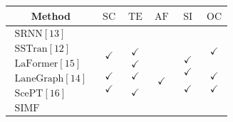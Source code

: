\documentclass{article}
\begin{document}

\begin{table}\vspace{-0.18in}
\begin{center}
 \setlength\tabcolsep{-0.75pt}
 \vspace{-8pt}
\begin{tabular}{cccccc}

\hline Method & $\mathrm{SC}$ & $\mathrm{TE}$ & $\mathrm{AF}$ & $\mathrm{SI}$ & $\mathrm{OC}$  \\
\hline $\begin{array}{l}\text {SRNN}[13]
\\
\text {SSTran}[12] \\
\text {LaFormer}[15]\\
\text {LaneGraph}[14] \\
\text {ScePT}[16] \\
\text{SIMF}\end{array}$ & $\begin{array}{l}\\
\checkmark \\
\\
\\
\checkmark \\
\checkmark
\end{array}$ & 
$\begin{array}{l}
     \\ 
    \checkmark \\
    \checkmark \\
    \checkmark \\
    \\
    \checkmark
     
\end{array}$
& $\begin{array}{l}
\\
 \\
 \\
\\
\\
\checkmark
\end{array} $
& $\begin{array}{cc}
   \\
   \\
   \checkmark\\
  \checkmark \\
   \\
   \checkmark
\end{array}$
& $\begin{array}{l}
\checkmark \\ \\
\\
\\
\checkmark
\\
\checkmark\end{array}$\\
\hline


\end{tabular}
\end{center}
\end{table}
\end{document}
